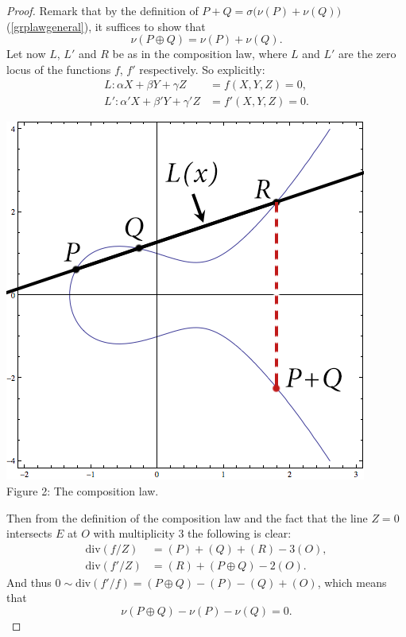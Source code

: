 \documentclass{article}
\numberwithin{equation}{section}
\theoremstyle{definition}
\begin{document}
\begin{proof}
Remark that by the definition of $P+Q=\sigma\big(\nu(P)+\nu(Q)\big)$ (\ref{grplawgeneral}), it suffices to show that $$\nu(P\oplus Q) = \nu(P)+\nu(Q).$$ Let now $L$, $L'$ and $R$ be as in the composition law, where $L$ and $L'$ are the zero locus of the functions $f$, $f'$ respectively. So explicitly: \begin{align*}
L:\alpha X+\beta Y + \gamma Z &=f(X,Y,Z)=0,\\
L': \alpha' X + \beta' Y + \gamma' Z &= f'(X,Y,Z)=0.
\end{align*} 

\begin{center}
\includegraphics[scale=.25]{addpointsexample}\\
Figure 2: The composition law.
\end{center}

Then from the definition of the composition law and the fact that the line $Z=0$ intersects $E$ at $O$ with multiplicity $3$ the following is clear: \begin{align*}
\text{div}(f/Z) &= (P)+(Q)+(R)-3(O),\\
\text{div}(f'/Z) &= (R)+(P\oplus Q) -2(O).
\end{align*}
And thus $0 \sim \text{div}(f'/f)=(P \oplus Q) - (P)-(Q)+(O)$, which means that $$\nu(P \oplus Q) - \nu(P)-\nu(Q) = 0.$$
\end{proof}
\end{document}
